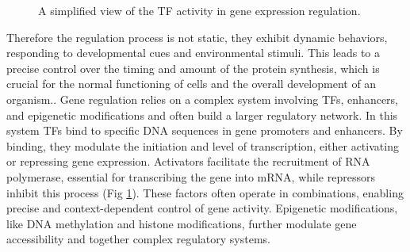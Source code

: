 \documentclass[pdftex,12pt,a4paper]{report}
\begin{document}
\begin{figure}
	\caption{A simplified view of the TF activity in gene expression regulation\cite{TF_fig}.}
	\label{TF_function}
\end{figure}
Therefore the regulation process is not static, they exhibit dynamic behaviors, responding to developmental cues and environmental stimuli\cite{GRN2}. 
This leads to a precise control over the timing and amount of the protein synthesis, which is crucial for the normal functioning of cells and the overall development of an organism.\cite{proteinfunction}.
Gene regulation relies on a complex system involving TFs, enhancers, and epigenetic modifications and often build a larger regulatory network. In this system TFs bind to specific DNA sequences in gene promoters and enhancers. By binding, they modulate the initiation and level of transcription, either activating or repressing gene expression. Activators facilitate the recruitment of RNA polymerase, essential for transcribing the gene into mRNA, while repressors inhibit this process (Fig \ref{TF_function}). These factors often operate in combinations, enabling precise and context-dependent control of gene activity. Epigenetic modifications, like DNA methylation and histone modifications, further modulate gene accessibility\cite{TFs} and together complex regulatory systems.
\end{document}

